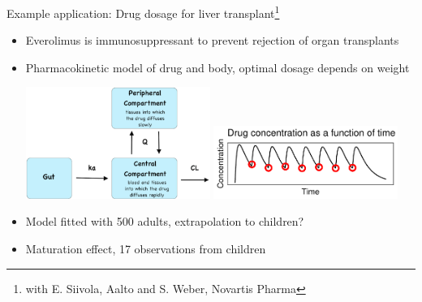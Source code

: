 \documentclass[english,t]{beamer}
\newcommand{\kin}{k^{\rm in}}
\newcommand{\kout}{k^{\rm out}}
\newcommand{\eff}{{E_{\rm max}}}
\begin{document}



\begin{frame}{Example application: Drug dosage for liver transplant\footnote{\color{gray}with E. Siivola, Aalto and S. Weber, Novartis Pharma}}

  \vspace{-0.5\baselineskip}
\begin{itemize}
\item Everolimus is immunosuppressant to prevent rejection of organ
  transplants
\item Pharmacokinetic model of drug and body, optimal dosage depends on weight\\
  \begin{minipage}[t]{\textwidth}
    \vspace{-.2\baselineskip}
  \hspace{-1.2cm}\includegraphics[width=6cm]{2compartment_graph.png}
  \includegraphics[width=6cm]{data_population_simple.pdf}
\end{minipage}
    \vspace{.2\baselineskip}
\item<2-> Model fitted with 500 adults, extrapolation to children?
\item<3-> Maturation effect, 17 observations from children
\end{itemize}

\end{frame}
\end{document}
